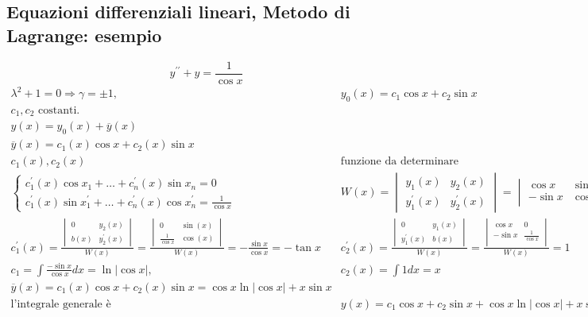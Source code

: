\subsection{Equazioni differenziali lineari, Metodo di Lagrange: esempio}
\begin{equation*}
	y^{\prime\prime}+y=\frac{1}{\cos x}
\end{equation*}
\begin{eqnarray*}
	\lambda^2+1=0\Rightarrow \gamma=\pm1,&y_0(x)=c_1\cos x+c_2\sin x\\
	c_1,c_2\text{ costanti}.\\
	y(x)=y_0(x)+\overline{y}(x)\\
	\overline{y}(x)=c_1(x)\cos x+c_2(x)\sin x\\
	c_1(x),c_2(x)&\text{funzione da determinare}\\
	\begin{cases}
		c_1^\prime(x)\cos x_1+\dots+c_n^\prime(x)\sin x_n=0\\
		c_1^\prime(x)\sin x_1^\prime+\dots+c_n^\prime(x)\cos x_n^\prime=\frac{1}{\cos x}
	\end{cases}&W(x)=\begin{vmatrix}
		y_1(x)&y_2(x)\\
		y^\prime_1(x)&y^\prime_2(x)
	\end{vmatrix}=\begin{vmatrix}
		\cos x&\sin x\\
		-\sin x&\cos x\\
	\end{vmatrix}=1\\
	c_1^\prime(x)=\frac{\begin{vmatrix}
		0&y_2(x)\\
		b(x)&y^\prime_2(x)
	\end{vmatrix}}{W(x)}=\frac{\begin{vmatrix}
		0&\sin(x)\\
		\frac{1}{\cos x}&\cos(x)
	\end{vmatrix}}{W(x)}=-\frac{\sin x}{\cos x}=-\tan x&c_2^\prime(x)=\frac{\begin{vmatrix}
		0&y_1(x)\\
		y^\prime_1(x)&b(x)
	\end{vmatrix}}{W(x)}=\frac{\begin{vmatrix}
		\cos x&0\\
		-\sin x&\frac{1}{\cos x}\\
	\end{vmatrix}}{W(x)}=1\\
	c_1=\int\frac{-\sin x}{\cos x}dx=\ln|\cos x|,&c_2(x)=\int 1dx=x\\
	\overline{y}(x)=c_1(x)\cos x+c_2(x)\sin x=\cos x \ln|\cos x|+x\sin x\\
	\text{l'integrale generale è}&y(x)=c_1\cos x+c_2\sin x+\cos x\ln|\cos x|+x\sin x
\end{eqnarray*}
